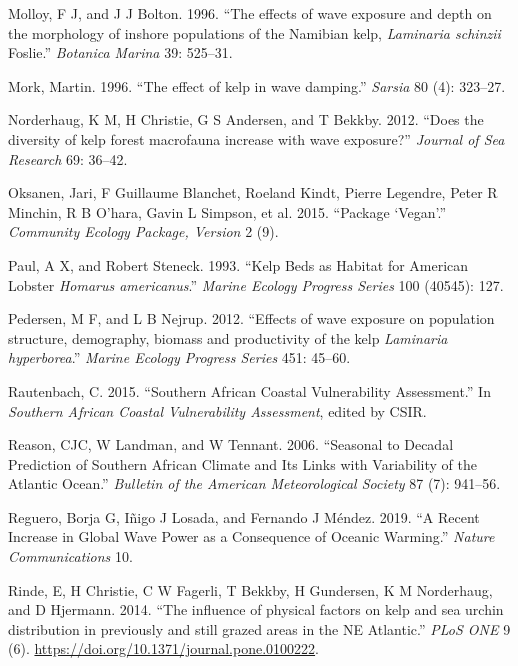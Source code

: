 \documentclass[
  a4paper,
]{article}
\begin{document}
\leavevmode\hypertarget{ref-Molloy1996-la}{}%
Molloy, F J, and J J Bolton. 1996. ``The effects of wave exposure and
depth on the morphology of inshore populations of the Namibian kelp,
\emph{Laminaria schinzii} Foslie.'' \emph{Botanica Marina} 39: 525--31.

\leavevmode\hypertarget{ref-Mork1996-md}{}%
Mork, Martin. 1996. ``The effect of kelp in wave damping.''
\emph{Sarsia} 80 (4): 323--27.

\leavevmode\hypertarget{ref-Norderhaug2012-ks}{}%
Norderhaug, K M, H Christie, G S Andersen, and T Bekkby. 2012. ``Does
the diversity of kelp forest macrofauna increase with wave exposure?''
\emph{Journal of Sea Research} 69: 36--42.

\leavevmode\hypertarget{ref-Oksanen2015-vj}{}%
Oksanen, Jari, F Guillaume Blanchet, Roeland Kindt, Pierre Legendre,
Peter R Minchin, R B O'hara, Gavin L Simpson, et al. 2015. ``Package
`Vegan'.'' \emph{Community Ecology Package, Version} 2 (9).

\leavevmode\hypertarget{ref-Paul1993-bm}{}%
Paul, A X, and Robert Steneck. 1993. ``Kelp Beds as Habitat for American
Lobster \emph{Homarus americanus}.'' \emph{Marine Ecology Progress
Series} 100 (40545): 127.

\leavevmode\hypertarget{ref-Pedersen2012-vr}{}%
Pedersen, M F, and L B Nejrup. 2012. ``Effects of wave exposure on
population structure, demography, biomass and productivity of the kelp
\emph{Laminaria hyperborea}.'' \emph{Marine Ecology Progress Series}
451: 45--60.

\leavevmode\hypertarget{ref-Rautenbach2015a}{}%
Rautenbach, C. 2015. ``Southern African Coastal Vulnerability
Assessment.'' In \emph{Southern African Coastal Vulnerability
Assessment}, edited by CSIR.

\leavevmode\hypertarget{ref-Reason2006}{}%
Reason, CJC, W Landman, and W Tennant. 2006. ``Seasonal to Decadal
Prediction of Southern African Climate and Its Links with Variability of
the Atlantic Ocean.'' \emph{Bulletin of the American Meteorological
Society} 87 (7): 941--56.

\leavevmode\hypertarget{ref-Reguero2019}{}%
Reguero, Borja G, Iñigo J Losada, and Fernando J Méndez. 2019. ``A
Recent Increase in Global Wave Power as a Consequence of Oceanic
Warming.'' \emph{Nature Communications} 10.

\leavevmode\hypertarget{ref-Rinde2014}{}%
Rinde, E, H Christie, C W Fagerli, T Bekkby, H Gundersen, K M
Norderhaug, and D Hjermann. 2014. ``The influence of physical factors on
kelp and sea urchin distribution in previously and still grazed areas in
the NE Atlantic.'' \emph{PLoS ONE} 9 (6).
\url{https://doi.org/10.1371/journal.pone.0100222}.
\end{document}
